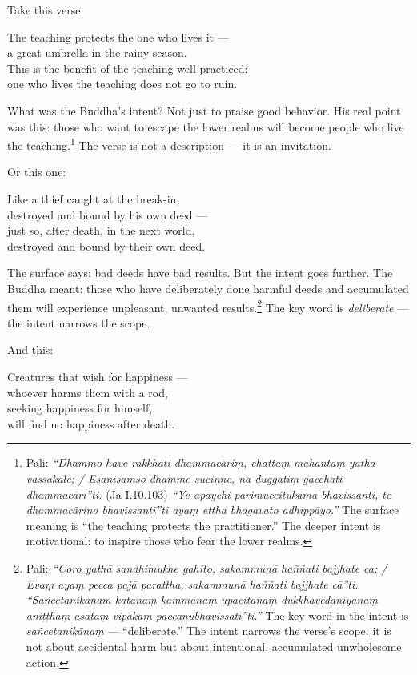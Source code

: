 Take this verse:

\begin{versebox}
The teaching protects the one who lives it ---\\
a great umbrella in the rainy season.\\
This is the benefit of the teaching well-practiced:\\
one who lives the teaching does not go to ruin.
\end{versebox}

What was the Buddha's intent? Not just to praise good behavior. His real point was this: those who want to escape the lower realms will become people who live the teaching.\footnote{Pali: \textit{``Dhammo have rakkhati dhammacāriṃ, chattaṃ mahantaṃ yatha vassakāle; / Esānisaṃso dhamme suciṇṇe, na duggatiṃ gacchati dhammacārī''ti.} (Jā I.10.103) \textit{``Ye apāyehi parimuccitukāmā bhavissanti, te dhammacārino bhavissantī''ti ayaṃ ettha bhagavato adhippāyo.''} The surface meaning is ``the teaching protects the practitioner.'' The deeper intent is motivational: to inspire those who fear the lower realms.} The verse is not a description --- it is an invitation.

Or this one:

\begin{versebox}
Like a thief caught at the break-in,\\
destroyed and bound by his own deed ---\\
just so, after death, in the next world,\\
destroyed and bound by their own deed.
\end{versebox}

The surface says: bad deeds have bad results. But the intent goes further. The Buddha meant: those who have deliberately done harmful deeds and accumulated them will experience unpleasant, unwanted results.\footnote{Pali: \textit{``Coro yathā sandhimukhe gahīto, sakammunā haññati bajjhate ca; / Evaṃ ayaṃ pecca pajā parattha, sakammunā haññati bajjhate cā''ti.} \textit{``Sañcetanikānaṃ katānaṃ kammānaṃ upacitānaṃ dukkhavedanīyānaṃ aniṭṭhaṃ asātaṃ vipākaṃ paccanubhavissatī''ti.''} The key word in the intent is \textit{sañcetanikānaṃ} --- ``deliberate.'' The intent narrows the verse's scope: it is not about accidental harm but about intentional, accumulated unwholesome action.} The key word is \textit{deliberate} --- the intent narrows the scope.

And this:

\begin{versebox}
Creatures that wish for happiness ---\\
whoever harms them with a rod,\\
seeking happiness for himself,\\
will find no happiness after death.
\end{versebox}


